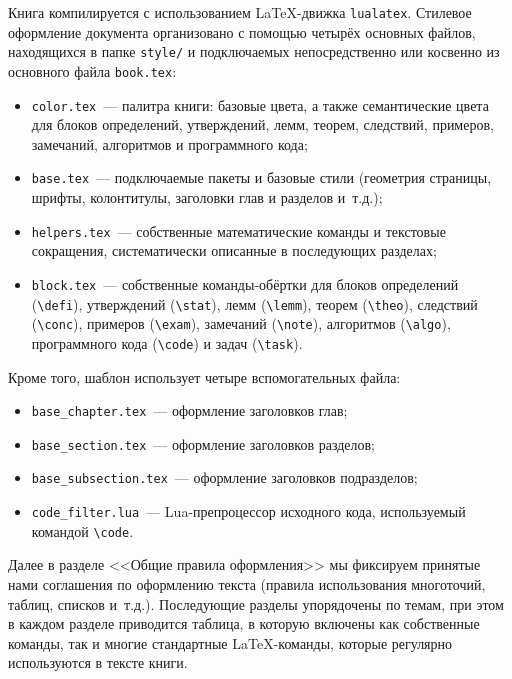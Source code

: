 Книга компилируется с использованием LaTeX-движка \verb|lualatex|.
Стилевое оформление документа организовано с помощью четырёх основных файлов, находящихся в папке \verb|style/| и подключаемых непосредственно или косвенно из основного файла \verb|book.tex|:
\begin{itemize}
    \item \verb|color.tex|~---
        палитра книги: базовые цвета, а также семантические цвета для блоков 
            определений,
            утверждений,
            лемм,
            теорем,
            следствий,
            примеров,
            замечаний,
            алгоритмов и
            программного кода;
    \item \verb|base.tex|~---
        подключаемые пакеты и базовые стили (геометрия страницы, шрифты, колонтитулы, заголовки глав и разделов и~т.д.);
    \item \verb|helpers.tex|~---
        собственные математические команды и текстовые сокращения, систематически описанные в последующих разделах;
    \item \verb|block.tex|~---
        собственные команды-обёртки для блоков
            определений (\verb|\defi|),
            утверждений (\verb|\stat|),
            лемм (\verb|\lemm|),
            теорем (\verb|\theo|),
            следствий (\verb|\conc|),
            примеров (\verb|\exam|),
            замечаний (\verb|\note|),
            алгоритмов (\verb|\algo|),
            программного кода (\verb|\code|)
            и задач (\verb|\task|).
\end{itemize}
Кроме того, шаблон использует четыре вспомогательных файла:
\begin{itemize}
    \item \verb|base_chapter.tex|~--- оформление заголовков глав;
    \item \verb|base_section.tex|~--- оформление заголовков разделов;
    \item \verb|base_subsection.tex|~--- оформление заголовков подразделов;
    \item \verb|code_filter.lua|~--- Lua-препроцессор исходного кода, используемый командой \verb|\code|.
\end{itemize}

Далее в разделе <<Общие правила оформления>> мы фиксируем принятые нами соглашения по оформлению текста (правила использования многоточий, таблиц, списков и~т.д.).
Последующие разделы упорядочены по темам, при этом в каждом разделе приводится таблица, в которую включены как собственные команды, так и многие стандартные LaTeX-команды, которые регулярно используются в тексте книги.